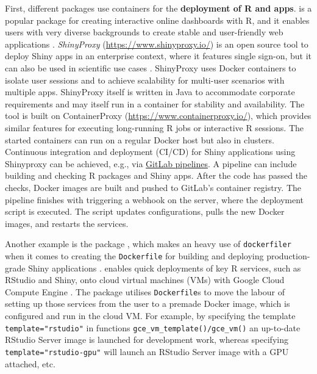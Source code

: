 First, different packages use containers for the \textbf{deployment of R
and  apps}.  is a popular package for
creating interactive online dashboards with R, and it enables users with
very diverse backgrounds to create stable and user-friendly web
applications \citep{cran_shiny}. \emph{ShinyProxy}
(\url{https://www.shinyproxy.io/}) is an open source tool to deploy
Shiny apps in an enterprise context, where it features single sign-on,
but it can also be used in scientific use cases
\citep[e.g., ][]{savini_epiexplorer_2019,glouzon_structurexplor_2017}.
ShinyProxy uses Docker containers to isolate user sessions and to
achieve scalability for multi-user scenarios with multiple apps.
ShinyProxy itself is written in Java to accommodate corporate
requirements and may itself run in a container for stability and
availability. The tool is built on ContainerProxy
(\url{https://www.containerproxy.io/}), which provides similar features
for executing long-running R jobs or interactive R sessions. The started
containers can run on a regular Docker host but also in clusters.
Continuous integration and deployment (CI/CD) for Shiny applications
using Shinyproxy can be achieved, e.g., via
\href{https://docs.gitlab.com/ee/ci/pipelines.html}{GitLab pipelines}. A
pipeline can include building and checking R packages and Shiny apps.
After the code has passed the checks, Docker images are built and pushed
to GitLab's container registry. The pipeline finishes with triggering a
webhook on the server, where the deployment script is executed. The
script updates configurations, pulls the new Docker images, and restarts
the services.

Another example is the package , which makes an heavy use
of \texttt{dockerfiler} when it comes to creating the
\texttt{Dockerfile} for building and deploying production-grade Shiny
applications \citep{cran_golem}.  enables
quick deployments of key R services, such as RStudio and Shiny, onto
cloud virtual machines (VMs) with Google Cloud Compute Engine
\citep{googleComputeEngineR_2019}. The package utilises
\texttt{Dockerfile}s to move the labour of setting up those services
from the user to a premade Docker image, which is configured and run in
the cloud VM. For example, by specifying the template
\texttt{template="rstudio"} in functions
\texttt{gce\_vm\_template()/gce\_vm()} an up-to-date RStudio Server
image is launched for development work, whereas specifying
\texttt{template="rstudio-gpu"} will launch an RStudio Server image with
a GPU attached, etc.

